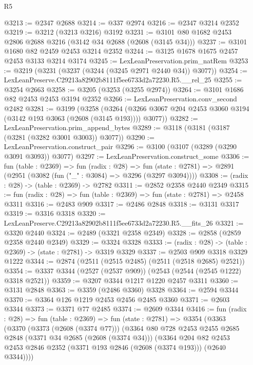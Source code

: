 \begin{lexlean}{R5}
\begin{coremodule}
@3213 := @2347 @2688
@3214 := @337 @2974
@3216 := @2347 @3214 @2352
@3219 := @3212 (@3213 @3216) @3192
@3231 := @3101 @80 @1682 @2453 @2806 @2688 @3216 (@3142 @34 @2688 (@2608 (@3145 @34)))
@3237 := @3101 @1680 @82 @2459 @2453 @3214 @2352
@3244 := @3125 @1678 @1675 @2457 @2453 @3133 @3214 @3174
@3245 := LexLeanPreservation.prim_natRem
@3253 := @3219 (@3231 (@3237 (@3244 (@3245 @2971 @2440 @34)) @3077))
@3254 := LexLeanPreserve.C29213a82902b8111f5ee6733d2a72230.R5.__rel_25
@3255 := @3254 @2663
@3258 := @3205 (@3253 (@3255 @2974))
@3264 := @3101 @1686 @82 @2453 @2453 @3194 @2352
@3266 := LexLeanPreservation.conv_second @2482
@3281 := @3199
    (@3258
      (@3264 (@3266 @3067 @204 @2453 @3060 @3194 (@3142 @193 @3063 (@2608 (@3145 @193)))) @3077))
@3282 := LexLeanPreservation.prim_append_bytes
@3289 := @3118 (@3181 (@3187 (@3281 (@3282 @3001 @3003)) @3077))
@3290 := LexLeanPreservation.construct_pair
@3296 := @3100 (@3107 (@3289 (@3290 @3091 @3093)) @3077)
@3297 := LexLeanPreservation.construct_some
@3306 := fun (table : @2369) =>
  fun (radix : @28) =>
  fun (state : @2781) => @2891 (@2951 (@3082 (fun ("_" : @3084) => @3296 (@3297 @3094))))
@3308 := (radix : @28) -> (table : @2369) -> @2782
@3311 := @2852 @2358 @2440 @2349
@3315 := fun (radix : @28) => fun (table : @2369) => fun (state : @2781) => @2458 @3311
@3316 := @2483 @909
@3317 := @2486 @2848
@3318 := @3131 @3317
@3319 := @3316 @3318
@3320 := LexLeanPreserve.C29213a82902b8111f5ee6733d2a72230.R5.__fits_26
@3321 := @3320 @2440
@3324 := @2489 (@3321 @2358 @2349)
@3328 := @2858 (@2859 @2358 @2440 @2349)
@3329 := @3324 @3328
@3333 := (radix : @28) -> (table : @2369) -> (state : @2781) -> @3319 @3329
@3337 := @2503 @909 @3318 @3329 @1222
@3344 := @2874 (@2511 (@2515 @2485) (@2511 (@2518 @2685) @2521))
@3354 := @3337 @3344 (@2527 (@2537 @909)) (@2543 (@2544 (@2545 @1222) @3318 @2521))
@3359 := @3207 @3344 @1217 @1220 @2457 @3311
@3360 := @3131 @2848
@3363 := @3359 (@2486 @3360) @3328
@3364 := @2594 @3344
@3370 := @3364 @126 @1219 @2453 @2456 @2485 @3360
@3371 := @2603 @3344
@3373 := @3371 @77 @2485
@3374 := @2609 @3344
@3416 := fun (radix : @28) =>
  fun (table : @2369) =>
  fun (state : @2781) =>
  @3354
    (@3363
      (@3370
        (@3373 (@2608 (@3374 @77)))
        (@3364
          @80
          @728
          @2453
          @2455
          @2685
          @2848
          (@3371 @34 @2685 (@2608 (@3374 @34)))
          (@3364
            @204
            @82
            @2453
            @2453
            @2846
            @2352
            (@3371 @193 @2846 (@2608 (@3374 @193)))
            (@2640 @3344))))

\end{coremodule}
\end{lexlean}
